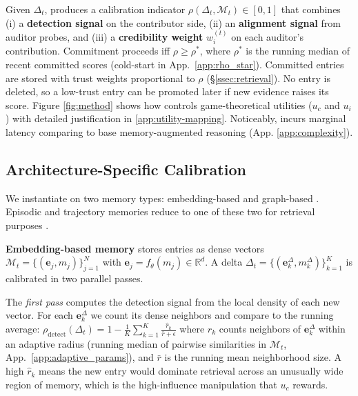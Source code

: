 Given $\Delta_t$, \system produces a calibration indicator
$\rho(\Delta_t, \mathcal{M}_t) \in [0,1]$ that combines (i) a
\textbf{detection signal} on the contributor side, (ii) an
\textbf{alignment signal} from auditor probes, and (iii) a
\textbf{credibility weight} $w_i^{(t)}$ on each auditor's
contribution. Commitment proceeds iff $\rho \geq \rho^*$, where
$\rho^*$ is the running median of recent committed scores
(cold-start in App.~\ref{app:rho_star}). Committed entries are
stored with trust weights proportional to $\rho$
(\S\ref{ssec:retrieval}). No entry is deleted, so a low-trust entry
can be promoted later if new evidence raises its score. Figure \ref{fig:method} shows how \system controls game-theoretical utilities ($u_c$ and  $u_i$) with detailed justification in \ref{app:utility-mapping}. Noticeably, \system incurs marginal latency comparing to base memory-augmented reasoning (App. \ref{app:complexity}).

\subsection{Architecture-Specific Calibration}
\label{ssec:arch_calib}

We instantiate \system on two memory types: embedding-based
\citep{wang2023voyager,zhong2024memorybank} and graph-based
\citep{anokhin2024arigraph,zhang2025g}. Episodic and trajectory
memories reduce to one of these two for retrieval purposes
\citep{anokhin2024arigraph,wang2023voyager}.

\textbf{Embedding-based memory} stores entries as dense vectors
$\mathcal{M}_t = \{(\mathbf{e}_j, m_j)\}_{j=1}^N$ with $\mathbf{e}_j =
f_\theta(m_j) \in \mathbb{R}^d$. A delta $\Delta_t =
\{(\mathbf{e}_k^\Delta, m_k^\Delta)\}_{k=1}^K$ is calibrated in two
parallel passes.

The \emph{first pass} computes the detection signal from the local
density of each new vector. For each $\mathbf{e}_k^\Delta$ we count
its dense neighbors and compare to the running average:
\(
    \rho_{\text{detect}}(\Delta_t) = 1 -
    \frac{1}{K} \sum_{k=1}^{K} \frac{\hat{r}_k}{\bar{r} + \epsilon}
\)
where $\hat{r}_k$ counts neighbors of $\mathbf{e}_k^\Delta$ within an
adaptive radius (running median of pairwise similarities in
$\mathcal{M}_t$, App.~\ref{app:adaptive_params}), and $\bar{r}$ is
the running mean neighborhood size. A high $\hat{r}_k$ means the new
entry would dominate retrieval across an unusually wide region of
memory, which is the high-influence manipulation that $u_c$ rewards.

